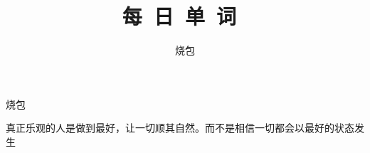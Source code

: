 \documentclass[a4paper, 12pt]{article}
\begin{document}
    \noindent

    \title{每\ 日\ 单\ 词\ }
    \author{烧包}
    \maketitle

\begin{multicols}{2}
\begin{flushleft}
烧包 \ \ \ \ \underline{\hspace{3cm}}
\end{flushleft}

\begin{flushleft}
真正乐观的人是做到最好，让一切顺其自然。而不是相信一切都会以最好的状态发生
 \ \ \ \ \underline{\hspace{3cm}}
\end{flushleft}
\end{multicols}
\end{document}
